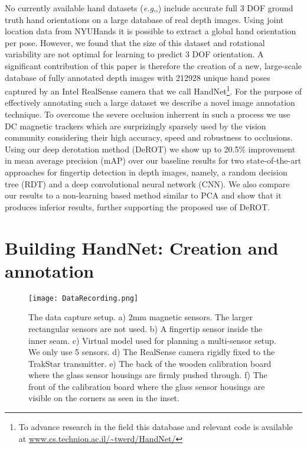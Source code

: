 \documentclass{bmvc2k}
\def\eg{\emph{e.g}\bmvaOneDot}
\begin{document}
No currently available hand datasets (\eg \cite{ZhaoCX12},\cite{qian2014realtime},\cite{tompson14tog}) include accurate full 3 DOF ground truth hand orientations on a large database of real depth images. Using joint location data from 
NYUHands \cite{tompson14tog} it is possible to extract a global hand 
orientation per pose. However, we found that the size of this dataset and rotational variability are 
not optimal for learning to predict 3 DOF orientation. A significant contribution of this paper is 
therefore the creation of a new, large-scale database of fully annotated depth images with 212928 
unique hand poses captured by an Intel RealSense camera that we call HandNet\footnote{To advance research in the field this database and relevant code is available at \url{www.cs.technion.ac.il/~twerd/HandNet/}}. For the purpose of effectively 
annotating such a large dataset we describe a novel image annotation technique. To overcome the severe 
occlusion  inherrent in such a process we use DC magnetic trackers which are surprizingly sparsely 
used by the vision community considering their high accuracy, speed and robustness to occlusions.
Using our deep derotation method (DeROT) we show up to 20.5\% improvement in mean average precision (mAP) over our baseline 
results for two state-of-the-art approaches for fingertip detection in depth images, namely, a 
random decision tree \cite{KeskinKKA11} (RDT) and a deep convolutional neural network \cite{tompson14tog} (CNN). We 
also compare our results to a non-learning based method similar to PCA and show that it produces 
inferior results, further supporting the proposed use of DeROT.


\section{Building HandNet: Creation and annotation} \label{sec:database}

\begin{figure}[t]
\begin{center}
\texttt{[image: DataRecording.png]}
\end{center}
   \caption{\scriptsize \color{blue} The data capture setup. a) 2mm magnetic sensors. The larger rectangular sensors are not used. b) A fingertip sensor inside the inner seam. c) Virtual model used for planning a multi-sensor setup. We only use 5 sensors. d) The RealSense camera rigidly fixed to the TrakStar transmitter. e) The back of the wooden calibration board where the glass sensor housings are firmly pushed through. f) The front of the calibration board where the glass sensor housings are visible on the corners as seen in the inset.}
\label{fig:dataprocess}
\end{figure}
\end{document}
